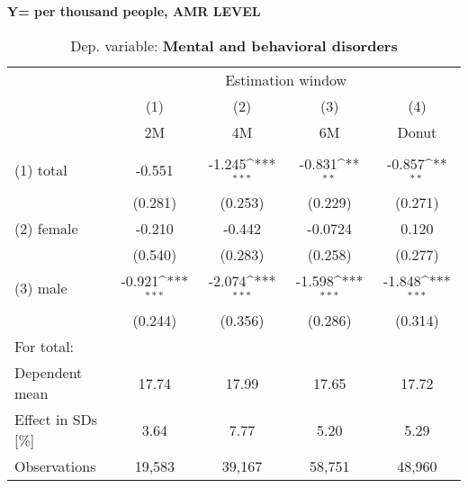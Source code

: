 \documentclass[11pt, a4paper]{article} %
\begin{document}
\textbf{Y= per thousand people, AMR LEVEL}
 \begin{table}[htbp] \centering 
 \begin{threeparttable} \centering 
 \caption{Dep. variable: \textbf{Mental and behavioral disorders}} 
 {\def\sym#1{\ifmmode^{#1}\else\(^{#1}\)\fi} 
 \begin{tabular}{l*{4}{c}} \toprule & \multicolumn{4}{c}{Estimation window} \\ \cmidrule(lr){2-5}
	&\multicolumn{1}{c}{(1)}&\multicolumn{1}{c}{(2)}&\multicolumn{1}{c}{(3)}&\multicolumn{1}{c}{(4)}\\
    &\multicolumn{1}{c}{2M}&\multicolumn{1}{c}{4M}&\multicolumn{1}{c}{6M}&\multicolumn{1}{c}{Donut}\\
	\midrule
\\
(1) {total} &   -0.551        &     -1.245\sym{***}    &      -0.831\sym{**}   &   -0.857\sym{**} \\
                        &  (0.281)        &    (0.253)       &     (0.229)     &  (0.271)   \\ 
(2) {female} &   -0.210        &     -0.442       &     -0.0724     &    0.120   \\
                        &  (0.540)        &    (0.283)       &     (0.258)     &  (0.277)   \\ 
(3) {male} &   -0.921\sym{***}     &     -2.074\sym{***}    &      -1.598\sym{***}  &   -1.848\sym{***}\\
                        &  (0.244)        &    (0.356)       &     (0.286)     &  (0.314)   \\
\midrule
For total: \\
Dependent mean &	17.74        &      17.99       &       17.65     &    17.72   \\
Effect in SDs [\%] & 3.64        &      7.77       &       5.20     &    5.29 \\ 
Observations & 19,583        &      39,167       &       58,751     &    48,960   \\
\bottomrule
\end{tabular}}
\end{threeparttable} \end{table} 
\end{document}
